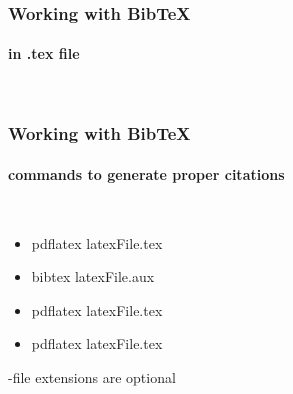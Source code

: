 \documentclass{beamer}
\begin{document}
\begin{frame}[fragile]
\frametitle{Working with BibTeX}
\framesubtitle{in .tex file}
\begin{lstlisting}


\end{lstlisting}
\end{frame}
\begin{frame}
\frametitle{Working with BibTeX}
\framesubtitle{commands to generate proper citations}
{\tt
\begin{itemize}
    \item pdflatex latexFile.tex
    \item bibtex latexFile.aux
    \item pdflatex latexFile.tex
    \item pdflatex latexFile.tex
\end{itemize}
}
-file extensions are optional
\end{frame}
\end{document}
